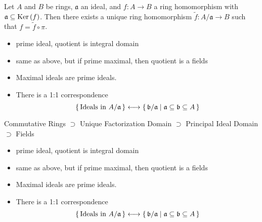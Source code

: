 \begin{prps}
    Let \(A\) and \(B\) be rings, \(\mathfrak{a}\) an ideal, and \(f: A \longrightarrow B\) a ring homomorphism with \(\mathfrak{a} \subseteq \mathrm{Ker} \left( f \right)\). Then there exists a unique ring homomorphism \(\tilde{f}: A / \mathfrak{a} \longrightarrow B\) such that \(f = \tilde{f} \circ \pi\).
\end{prps}

\begin{defn}
    
\end{defn}

\begin{thm}
    \begin{itemize}
        \item prime ideal, quotient is integral domain
        \item same as above, but if prime maximal, then quotient is a fields
        \item Maximal ideals are prime ideals.
        \item There is a 1:1 correspondence
        \begin{equation}
            \left\{\, \text{Ideals in \(A / \mathfrak{a}\)} \,\right\} \longleftrightarrow \left\{\, \mathfrak{b} / \mathfrak{a} \mathrel{\mid} \mathfrak{a} \subseteq \mathfrak{b} \subseteq A \,\right\}
        \end{equation}
    \end{itemize}
\end{thm}

\begin{defn}
    
\end{defn}

\begin{defn}
    
\end{defn}

\begin{prps}
    Commutative Rings \(\supset\) Unique Factorization Domain \(\supset\) Principal Ideal Domain \(\supset\) Fields
\end{prps}

\begin{thm}
    \begin{itemize}
        \item prime ideal, quotient is integral domain
        \item same as above, but if prime maximal, then quotient is a fields
        \item Maximal ideals are prime ideals.
        \item There is a 1:1 correspondence
        \begin{equation}
            \left\{\, \text{Ideals in \(A / \mathfrak{a}\)} \,\right\} \longleftrightarrow \left\{\, \mathfrak{b} / \mathfrak{a} \mathrel{\mid} \mathfrak{a} \subseteq \mathfrak{b} \subseteq A \,\right\}
        \end{equation}
    \end{itemize}
\end{thm}

